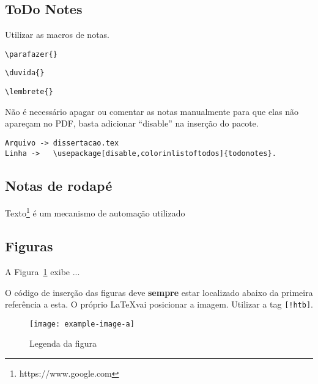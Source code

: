 \subsection{ToDo Notes}

Utilizar as macros de notas. 

\verb|\parafazer{}|

\verb|\duvida{}|

\verb|\lembrete{}|

Não é necessário apagar ou comentar as notas manualmente para que elas não apareçam no PDF, basta adicionar ``disable'' na inserção do pacote.

\begin{verbatim}
Arquivo -> dissertacao.tex 
Linha ->   \usepackage[disable,colorinlistoftodos]{todonotes}.
\end{verbatim}

\subsection{Notas de rodapé}

Texto\footnote{https://www.google.com} é um mecanismo de automação utilizado
	    
\subsection{Figuras}

A Figura~\ref{fig:figuraTeste} exibe ...

O código de inserção das figuras deve \textbf{sempre} estar localizado abaixo da primeira referência a esta. O próprio \LaTeX vai posicionar a imagem. Utilizar a tag \verb|[!htb]|.

\begin{figure}[!htb]
    \centering
    \texttt{[image: example-image-a]}
    \caption{Legenda da figura} 
    \label{fig:figuraTeste}
\end{figure}


